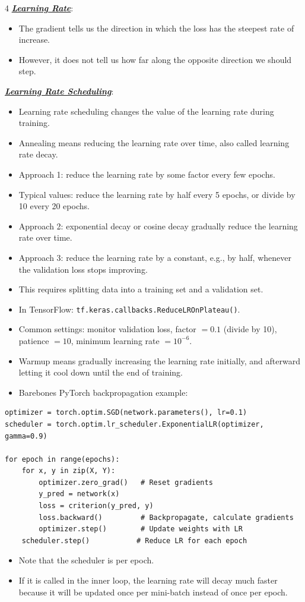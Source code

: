 \documentclass[12pt]{article}
\newcommand{\bulletPoint}[1]{\ul{\textit{\textbf{#1}}}}
\begin{document}
\begin{multicols*}{4}
\bulletPoint{Learning Rate}:
\begin{itemize}
\item The gradient tells us the direction in which the loss has the steepest rate of increase.
\item However, it does not tell us how far along the opposite direction we should step.
\end{itemize}

\bulletPoint{Learning Rate Scheduling}:
\begin{itemize}
\item Learning rate scheduling changes the value of the learning rate during training.
\item Annealing means reducing the learning rate over time, also called learning rate decay.
\item Approach 1: reduce the learning rate by some factor every few epochs.
\item Typical values: reduce the learning rate by half every 5 epochs, or divide by 10 every 20 epochs.
\item Approach 2: exponential decay or cosine decay gradually reduce the learning rate over time.
\item Approach 3: reduce the learning rate by a constant, e.g., by half, whenever the validation loss stops improving.
\item This requires splitting data into a training set and a validation set.
\item In TensorFlow: \texttt{tf.keras.callbacks.ReduceLROnPlateau()}.
\item Common settings: monitor validation loss, factor $=0.1$ (divide by 10), patience $=10$, minimum learning rate $=10^{-6}$.
\item Warmup means gradually increasing the learning rate initially, and afterward letting it cool down until the end of training.
\item Barebones PyTorch backpropagation example:
\end{itemize}
\begin{lstlisting}
optimizer = torch.optim.SGD(network.parameters(), lr=0.1)
scheduler = torch.optim.lr_scheduler.ExponentialLR(optimizer, gamma=0.9)

for epoch in range(epochs):
    for x, y in zip(X, Y):
        optimizer.zero_grad()   # Reset gradients
        y_pred = network(x)
        loss = criterion(y_pred, y)
        loss.backward()         # Backpropagate, calculate gradients
        optimizer.step()        # Update weights with LR
    scheduler.step()           # Reduce LR for each epoch
\end{lstlisting}
\begin{itemize}
\item Note that the scheduler is per epoch.
\item If it is called in the inner loop, the learning rate will decay much faster because it will be updated once per mini-batch instead of once per epoch.
\end{itemize}


\end{multicols*}
\end{document}

